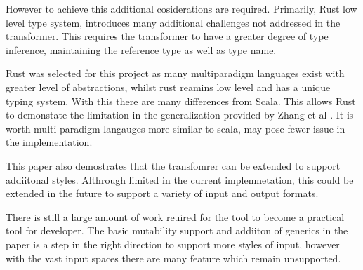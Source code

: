 \documentclass[ oneside,%
                    author={James Elgar},
                    degree={MEng},
                     title={Bidirectional transformer between functional and \\ object-oriented programming in Rust},
                  subtitle={}]{dissertation}
\newcommand{\weixin}{Zhang et al }
\begin{document}
However to achieve this additional cosiderations are required. Primarily, Rust low level type system, introduces many additional challenges not addressed in the \cite{food} transformer. This requires the transformer to have a greater degree of type inference, maintaining the reference type as well as type name.

Rust was selected for this project as many multiparadigm languages exist with greater level of abstractions, whilst rust reamins low level and has a unique typing system. With this there are many differences from Scala. This allows Rust to demonstate the limitation in the generalization provided by 
\weixin. It is worth multi-paradigm langauges more similar to scala, may pose fewer issue in the implementation.

This paper also demostrates that the transfomrer can be extended to support addiitonal styles. Althrough limited in the current implemnetation, this could be extended in the future to support a variety of input and output formats.

There is still a large amount of work reuired for the tool to become a practical tool for developer. The basic mutability support and addiiton of generics in the paper is a step in the right direction to support more styles of input, however with the vast input spaces there are many feature which remain unsupported.


\end{document}
